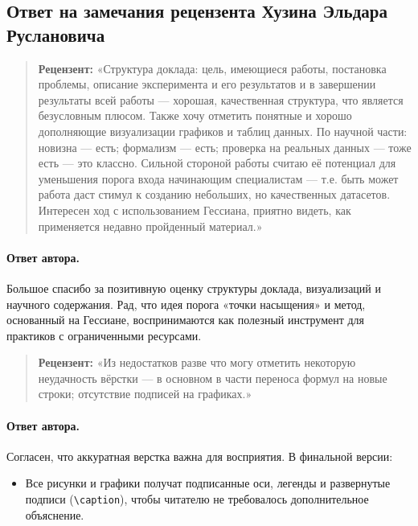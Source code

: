 \documentclass[11pt]{article}
\begin{document}
\pagestyle{empty}

\begin{center}
    \subsection*{Ответ на замечания рецензента Хузина Эльдара Руслановича}
\end{center}

\begin{quote}
    \textbf{Рецензент:}
    «Структура доклада: цель, имеющиеся работы, постановка проблемы, описание эксперимента и его результатов и в завершении результаты всей работы — хорошая, качественная структура, что является безусловным плюсом. Также хочу отметить понятные и хорошо дополняющие визуализации графиков и таблиц данных. По научной части: новизна — есть; формализм — есть; проверка на реальных данных — тоже есть — это классно. Сильной стороной работы считаю её потенциал для уменьшения порога входа начинающим специалистам — т.е. быть может работа даст стимул к созданию небольших, но качественных датасетов. Интересен ход с использованием Гессиана, приятно видеть, как применяется недавно пройденный материал.»
\end{quote}

\paragraph{Ответ автора.}
Большое спасибо за позитивную оценку структуры доклада, визуализаций и научного содержания. Рад, что идея порога «точки насыщения» и метод, основанный на Гессиане, воспринимаются как полезный инструмент для практиков с ограниченными ресурсами.

\begin{quote}
    \textbf{Рецензент:}
    «Из недостатков разве что могу отметить некоторую неудачность вёрстки — в основном в части переноса формул на новые строки; отсутствие подписей на графиках.»
\end{quote}

\paragraph{Ответ автора.}
Согласен, что аккуратная верстка важна для восприятия. В финальной версии:
\begin{itemize}
    \item Все рисунки и графики получат подписанные оси, легенды и развернутые подписи (\verb|\caption|), чтобы читателю не требовалось дополнительное объяснение.
\end{itemize}
\end{document}
